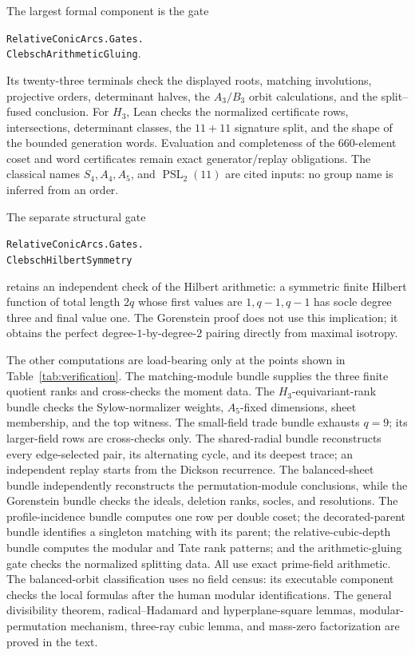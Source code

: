 \documentclass[11pt]{article}
\theoremstyle{definition}
\theoremstyle{remark}
\begin{document}
The largest formal component is the gate
\begin{center}
\small\texttt{RelativeConicArcs.Gates.}\\[-2pt]
\texttt{ClebschArithmeticGluing}.
\end{center}
Its twenty-three terminals check the displayed roots, matching involutions, projective
orders, determinant halves, the $A_3/B_3$ orbit calculations, and the
split--fused conclusion.  For $H_3$, Lean checks the normalized
certificate rows, intersections, determinant classes, the $11+11$
signature split, and the shape of the bounded generation words.
Evaluation and completeness of the $660$-element coset and word
certificates remain exact generator/replay obligations.  The classical
names $S_4,A_4,A_5$, and $\operatorname{PSL}_2(11)$ are cited inputs:
no group name is inferred from an order.

The separate structural gate
\begin{center}
\small\texttt{RelativeConicArcs.Gates.}\\[-2pt]
\texttt{ClebschHilbertSymmetry}
\end{center}
retains an independent check of the Hilbert arithmetic: a symmetric
finite Hilbert function of total length \(2q\) whose first values are
\(1,q-1,q-1\) has socle degree three and final value one.  The
Gorenstein proof does not use this implication; it obtains the perfect
degree-\(1\)-by-degree-\(2\) pairing directly from maximal isotropy.

The other computations are load-bearing only at the points shown in
Table~\ref{tab:verification}.  The matching-module bundle supplies the
three finite quotient ranks and cross-checks the moment data.  The
\(H_3\)-equivariant-rank bundle checks the Sylow-normalizer weights,
\(A_5\)-fixed dimensions, sheet membership, and the top witness.  The
small-field trade bundle exhausts \(q=9\); its larger-field rows are
cross-checks only.  The shared-radial bundle
reconstructs every edge-selected pair, its alternating cycle, and its
deepest trace; an independent replay starts from the Dickson recurrence.
The balanced-sheet bundle independently reconstructs the
permutation-module conclusions, while the Gorenstein bundle checks the
ideals, deletion ranks, socles, and resolutions.  The profile-incidence
bundle computes one row per double coset; the decorated-parent bundle
identifies a singleton matching with its parent; the
relative-cubic-depth bundle computes the modular and Tate rank patterns;
and the arithmetic-gluing gate checks the normalized splitting data.
All use exact prime-field arithmetic.  The balanced-orbit classification
uses no field census: its executable component checks the local formulas
after the human modular identifications.  The general divisibility theorem,
radical--Hadamard and hyperplane-square lemmas, modular-permutation
mechanism, three-ray cubic lemma, and mass-zero factorization are proved in
the text.
\end{document}
